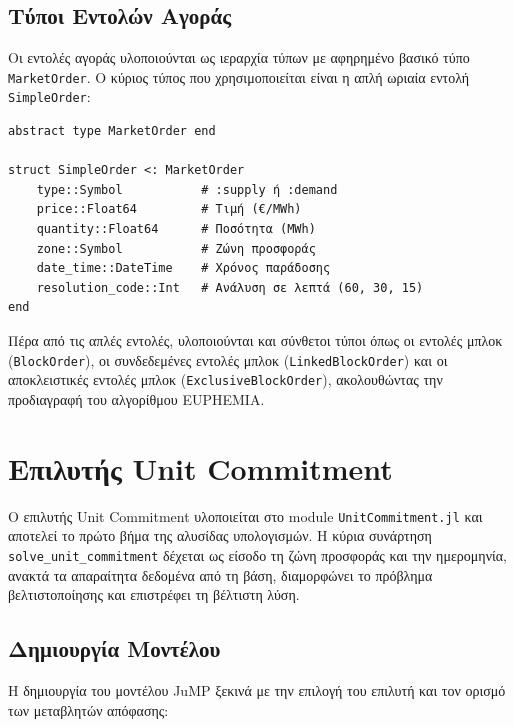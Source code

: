 \subsection{Τύποι Εντολών Αγοράς}
\label{subsec:market-orders}

Οι εντολές αγοράς υλοποιούνται ως ιεραρχία τύπων με αφηρημένο βασικό τύπο \texttt{MarketOrder}. Ο κύριος τύπος που χρησιμοποιείται είναι η απλή ωριαία εντολή \texttt{SimpleOrder}:

\begin{samepage}
\begin{verbatim}
abstract type MarketOrder end

struct SimpleOrder <: MarketOrder
    type::Symbol           # :supply ή :demand
    price::Float64         # Τιμή (€/MWh)
    quantity::Float64      # Ποσότητα (MWh)
    zone::Symbol           # Ζώνη προσφοράς
    date_time::DateTime    # Χρόνος παράδοσης
    resolution_code::Int   # Ανάλυση σε λεπτά (60, 30, 15)
end
\end{verbatim}
\end{samepage}

Πέρα από τις απλές εντολές, υλοποιούνται και σύνθετοι τύποι όπως οι εντολές μπλοκ (\texttt{BlockOrder}), οι συνδεδεμένες εντολές μπλοκ (\texttt{LinkedBlockOrder}) και οι αποκλειστικές εντολές μπλοκ (\texttt{ExclusiveBlockOrder}), ακολουθώντας την προδιαγραφή του αλγορίθμου EUPHEMIA.


\section{Επιλυτής Unit Commitment}
\label{sec:uc-solver}

Ο επιλυτής Unit Commitment υλοποιείται στο module \texttt{UnitCommitment.jl} και αποτελεί το πρώτο βήμα της αλυσίδας υπολογισμών. Η κύρια συνάρτηση \texttt{solve\_unit\_commitment} δέχεται ως είσοδο τη ζώνη προσφοράς και την ημερομηνία, ανακτά τα απαραίτητα δεδομένα από τη βάση, διαμορφώνει το πρόβλημα βελτιστοποίησης και επιστρέφει τη βέλτιστη λύση.

\subsection{Δημιουργία Μοντέλου}
\label{subsec:uc-model-creation}

Η δημιουργία του μοντέλου JuMP ξεκινά με την επιλογή του επιλυτή και τον ορισμό των μεταβλητών απόφασης:

